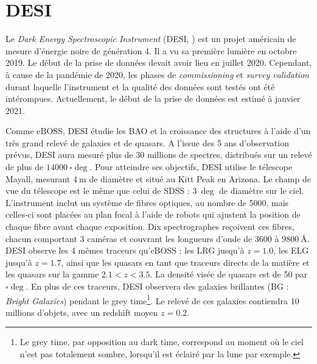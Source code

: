 \section{DESI}

Le \emph{Dark Energy Spectroscopic Instrument} (DESI, \textcite{DESICollaboration2016}) est un projet américain de mesure d'énergie noire de génération 4.
Il a vu sa première lumière en octobre 2019. %
Le début de la prise de données devait avoir lieu en juillet 2020. Cependant, à cause de la pandémie de 2020, les phases de \emph{commissioning} et \emph{survey validation} durant laquelle l'instrument et  la qualité des données sont testés ont été intérompues. Actuellement, le début de la prise de données est estimé à janvier 2021.


Comme eBOSS, DESI étudie les BAO et la croissance des structures à l'aide d'un très grand relevé de galaxies et de quasars. A l'issue des 5 ans d'observation prévus, DESI aura mesuré plus de 30 millions de spectres, distribués sur un relevé de plus de $\SI{14000}{\square\deg}$.
Pour atteindre ses objectifs, DESI utilise le télescope Mayall, mesurant $\SI{4}{\meter}$ de diamètre et situé au Kitt Peak en Arizona. Le champ de vue du télescope est le même que celui de SDSS : $\SI{3}{\deg}$ de diamètre sur le ciel. L'instrument inclut un système de fibres optiques, au nombre de \num{5000}, mais celles-ci sont placées au plan focal à l'aide de robots qui ajustent la position de chaque fibre avant chaque exposition. Dix spectrographes reçoivent ces fibres, chacun comportant 3 caméras et couvrant les longueurs d'onde de \num{3600} à $\SI{9800}{\angstrom}$.
‌‌DESI observe les 4 mêmes traceurs qu'eBOSS : les LRG jusqu'à $z=\num{1,0}$, les ELG jusqu'à $z=\num{1,7}$, ainsi que les quasars en tant que traceurs directs de la matière et les quasars \lya{} sur la gamme $\num{2,1} < z < \num{3,5}$. La densité visée de quasars \lya{} est de \num{50} par $\si{\square\deg}$.
En plus de ces traceurs, DESI observera des galaxies brillantes (BG : \emph{Bright Galaxies}) pendant le grey time\footnote{Le grey time, par opposition au dark time, correspond au moment où le ciel n'est pas totalement sombre, lorsqu'il est éclairé par la lune par exemple.}. Le relevé de ces galaxies contiendra 10 millions d'objets, avec un redshift moyen $z=\num{0,2}$.

